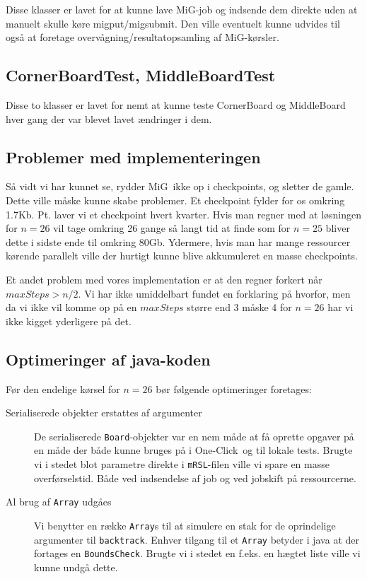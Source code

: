 \documentclass[final,a4paper,11pt]{article}
\newcommand{\mig}{MiG}
\newcommand{\oc}{One-Click}
\begin{document}
Disse klasser er lavet for at kunne lave \mig-job og indsende dem direkte uden
at manuelt skulle køre migput/migsubmit. Den ville eventuelt kunne udvides til
også at foretage overvågning/resultatopsamling af \mig-kørsler.

\subsection{CornerBoardTest, MiddleBoardTest}

Disse to klasser er lavet for nemt at kunne teste CornerBoard og MiddleBoard
hver gang der var blevet lavet ændringer i dem. 

\subsection{Problemer med implementeringen}

Så vidt vi har kunnet se, rydder \mig\ ikke op i checkpoints, og sletter de
gamle. Dette ville måske kunne skabe problemer. Et checkpoint fylder for os omkring
1.7Kb. Pt. laver vi et checkpoint hvert kvarter. Hvis man regner med at
løsningen for $n=26$ vil tage omkring 26 gange så langt tid at finde som for $n=25$
bliver dette i sidste ende til omkring 80Gb. Ydermere, hvis man har mange
ressourcer kørende parallelt ville der hurtigt kunne blive akkumuleret en masse
checkpoints. 

Et andet problem med vores implementation er at den regner forkert når
$maxSteps>n/2$. Vi har ikke umiddelbart fundet en forklaring på hvorfor, men da
vi ikke vil komme op på en $maxSteps$ større end 3 måske 4 for $n=26$ har vi
ikke kigget yderligere på det.

\subsection{Optimeringer af java-koden}
Før den endelige kørsel for $n=26$ bør følgende optimeringer foretages:

\begin{description}
	\item[Serialiserede objekter erstattes af argumenter]
	De serialiserede \texttt{Board}-objekter var en nem måde at få oprette opgaver på en måde der både kunne bruges på i \oc\ og til lokale tests. Brugte vi i stedet blot parametre direkte i \texttt{mRSL}-filen ville vi spare en masse overførselstid. Både ved indsendelse af job og ved jobskift på ressourcerne.  
	\item[Al brug af \texttt{Array} udgåes]
	Vi benytter en række \texttt{Array}s til at simulere en stak for de oprindelige argumenter til \texttt{backtrack}. Enhver tilgang til et \texttt{Array} betyder i java at der fortages en \texttt{BoundsCheck}. Brugte vi i stedet en f.eks. en hægtet liste ville vi kunne undgå dette.
	 
\end{description}
\end{document}
